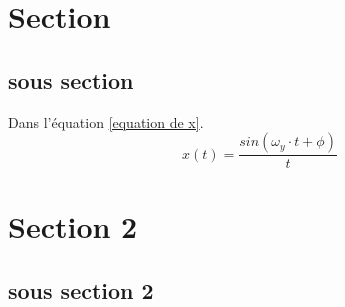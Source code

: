 \section{Section}

\subsection{sous section}

Dans l'équation \ref{equation de x}.
\begin{equation}
x(t) = \frac{sin(\omega_y \cdot t + \phi)} {t}
\label{equation de x}
\end{equation}


\section{Section 2}

\subsection{sous section 2}

